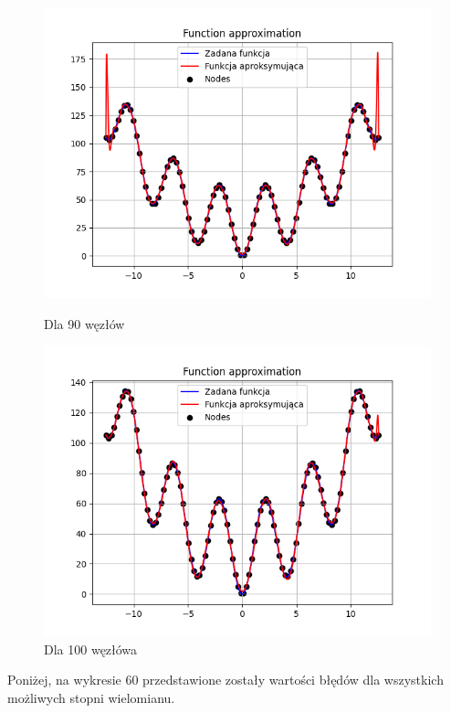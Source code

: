 \documentclass{article}
\begin{document}
\begin{figure}[H]
\begin{minipage}[b]{0.49\textwidth}
    \begin{minipage}[b]{\textwidth}
      \includegraphics[width=\textwidth]{img58.png}
      \caption{Dla 90 węzłów}
    \end{minipage}
    \vspace*{\fill}
    \begin{minipage}[b]{\textwidth}
      \includegraphics[width=\textwidth]{img59.png}
      \caption{Dla 100 węzłówa}
    \end{minipage}
  \end{minipage}
\end{figure}

Poniżej, na wykresie 60 przedstawione zostały wartości błędów dla wszystkich możliwych stopni wielomianu.
\end{document}

